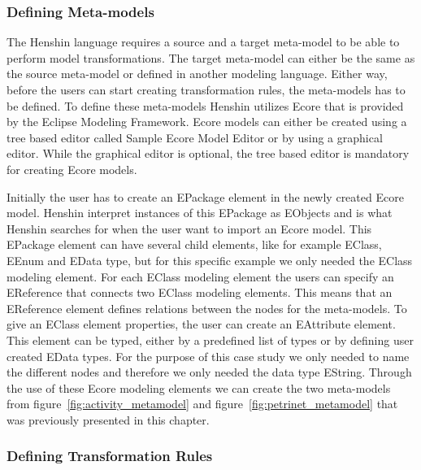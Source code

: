 \subsubsection*{Defining Meta-models}
\label{sec:henshin_metamodeling}

The Henshin language requires a source and a target meta-model to be able to
perform model transformations. The target meta-model can either be the same as
the source meta-model or defined in another modeling language. Either way, before
the users can start creating transformation rules, the meta-models has
to be defined. To define these meta-models Henshin utilizes Ecore that is
provided by the Eclipse Modeling Framework\cite{Steinberg2009}. Ecore models
can either be created using a tree based editor called Sample Ecore Model
Editor or by using a graphical editor. While the graphical editor is optional,
the tree based editor is mandatory for creating Ecore models.

Initially the user has to create an EPackage element in the newly created Ecore
model. Henshin interpret instances of this EPackage as EObjects and is what
Henshin searches for when the user want to import an Ecore model. This EPackage
element can have several child elements, like for example EClass, EEnum and
EData type, but for this specific example we only needed the EClass
modeling element. For each EClass modeling element the users can specify an
EReference that connects two EClass modeling elements. This means that an
EReference element defines relations between the nodes for the meta-models. To give an
EClass element properties, the user can create an EAttribute element.
This element can be typed, either by a predefined list of types or by defining
user created EData types. For the purpose of this case study we only needed to
name the different nodes and therefore we only needed the data type EString.
Through the use of these Ecore modeling elements we can create the two
meta-models from figure~\ref{fig:activity_metamodel} and
figure~\ref{fig:petrinet_metamodel} that was previously presented in this
chapter.


\subsubsection*{Defining Transformation Rules}

